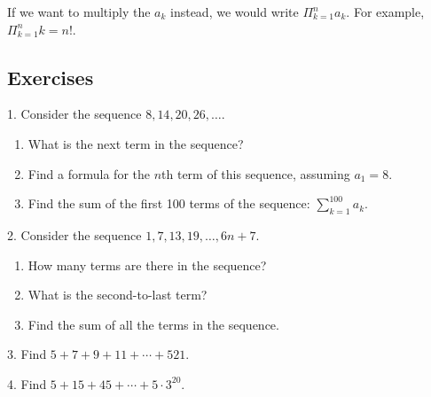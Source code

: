 \documentclass[10pt,]{book}
\theoremstyle{plain}
\theoremstyle{definition}
\theoremstyle{definition}
\theoremstyle{definition}
\numberwithin{equation}{chapter}
\def\d{\displaystyle}
\def\prod{\Pi}
\begin{document}
        If we want to multiply the \(a_k\) instead, we would write \(\d\prod_{k=1}^n a_k\). For example, \(\d\prod_{k=1}^n k = n!\).
\typeout{************************************************}
\typeout{************************************************}
\subsection[Exercises]{Exercises}\label{exercises-13}
\begin{exerciselist}
\item[1.]\hypertarget{exercise-145}{}
              Consider the sequence \(8, 14, 20, 26, \ldots\).
\leavevmode%
\begin{enumerate}[label=(\alph*)]
\item\hypertarget{li-891}{}
                  What is the next term in the sequence?
\item\hypertarget{li-892}{}
                  Find a formula for the \(n\)th term of this sequence, assuming \(a_1 = 8\).
\item\hypertarget{li-893}{}
                  Find the sum of the first 100 terms of the sequence: \(\sum_{k=1}^{100}a_k\).
\end{enumerate}
\par\smallskip
\item[2.]\hypertarget{exercise-146}{}
              Consider the sequence \(1, 7, 13, 19, \ldots, 6n + 7\).
\leavevmode%
\begin{enumerate}[label=(\alph*)]
\item\hypertarget{li-897}{}
                  How many terms are there in the sequence?
\item\hypertarget{li-898}{}
                  What is the second-to-last term?
\item\hypertarget{li-899}{}
                  Find the sum of all the terms in the sequence.
\end{enumerate}
\par\smallskip
\item[3.]\hypertarget{exercise-147}{}
              Find \(5 + 7 + 9 + 11+ \cdots + 521\).
\par\smallskip
\item[4.]\hypertarget{exercise-148}{}
              Find \(5 + 15 + 45 + \cdots + 5\cdot 3^{20}\).
\par\smallskip

\end{exerciselist}
\end{document}
